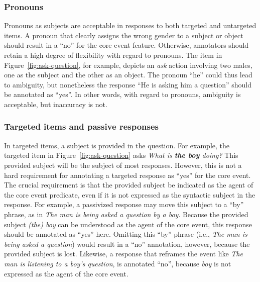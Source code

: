 \documentclass[12pt,notitlepage]{article}
\begin{document}
\subsubsection{Pronouns} Pronouns as subjects are acceptable in responses to both targeted and untargeted items. A pronoun that clearly assigns the wrong gender to a subject or object should result in a ``no'' for the core event feature. Otherwise, annotators should retain a high degree of flexibility with regard to pronouns. The item in Figure~\ref{fig:ask-question}, for example, depicts an \textit{ask} action involving two males, one as the subject and the other as an object. The pronoun ``he'' could thus lead to ambiguity, but nonetheless the response ``He is asking him a question'' should be annotated as ``yes''. In other words, with regard to pronouns, ambiguity is acceptable, but inaccuracy is not.

\subsubsection{Targeted items and passive responses} \label{sec:core-targeted} In targeted items, a subject is provided in the question. For example, the targeted item in Figure~\ref{fig:ask-question} asks \textit{What is \textbf{the boy} doing?} This provided subject will be the subject of most responses. However, this is not a hard requirement for annotating a targeted response as ``yes'' for the core event. The crucial requirement is that the provided subject be indicated as the agent of the core event predicate, even if it is not expressed as the syntactic subject in the response. For example, a passivized response may move this subject to a ``by'' phrase, as in \textit{The man is being asked a question by a boy}. Because the provided subject \textit{(the) boy} can be understood as the agent of the core event, this response should be annotated as ``yes'' here. Omitting this ``by'' phrase (i.e., \textit{The man is being asked a question}) would result in a ``no'' annotation, however, because the provided subject is lost. 
Likewise, a response that reframes the event like \textit{The man is listening to a boy's question}, is annotated ``no'', because \textit{boy} is not expressed as the agent of the core event. %
\end{document}
